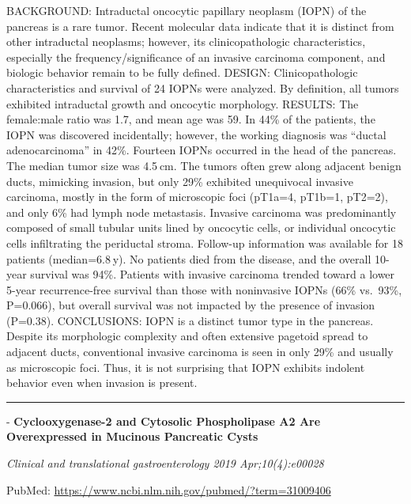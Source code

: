 \documentclass[]{article}
\begin{document}
BACKGROUND: Intraductal oncocytic papillary neoplasm (IOPN) of the
pancreas is a rare tumor. Recent molecular data indicate that it is
distinct from other intraductal neoplasms; however, its
clinicopathologic characteristics, especially the frequency/significance
of an invasive carcinoma component, and biologic behavior remain to be
fully defined. DESIGN: Clinicopathologic characteristics and survival of
24 IOPNs were analyzed. By definition, all tumors exhibited intraductal
growth and oncocytic morphology. RESULTS: The female:male ratio was 1.7,
and mean age was 59. In 44\% of the patients, the IOPN was discovered
incidentally; however, the working diagnosis was ``ductal
adenocarcinoma'' in 42\%. Fourteen IOPNs occurred in the head of the
pancreas. The median tumor size was 4.5 cm. The tumors often grew along
adjacent benign ducts, mimicking invasion, but only 29\% exhibited
unequivocal invasive carcinoma, mostly in the form of microscopic foci
(pT1a=4, pT1b=1, pT2=2), and only 6\% had lymph node metastasis.
Invasive carcinoma was predominantly composed of small tubular units
lined by oncocytic cells, or individual oncocytic cells infiltrating the
periductal stroma. Follow-up information was available for 18 patients
(median=6.8 y). No patients died from the disease, and the overall
10-year survival was 94\%. Patients with invasive carcinoma trended
toward a lower 5-year recurrence-free survival than those with
noninvasive IOPNs (66\% vs.~93\%, P=0.066), but overall survival was not
impacted by the presence of invasion (P=0.38). CONCLUSIONS: IOPN is a
distinct tumor type in the pancreas. Despite its morphologic complexity
and often extensive pagetoid spread to adjacent ducts, conventional
invasive carcinoma is seen in only 29\% and usually as microscopic foci.
Thus, it is not surprising that IOPN exhibits indolent behavior even
when invasion is present.

{}

{}

\begin{center}\rule{0.5\linewidth}{\linethickness}\end{center}

 - \textbf{Cyclooxygenase-2 and Cytosolic Phospholipase A2 Are
Overexpressed in Mucinous Pancreatic Cysts}

\emph{Clinical and translational gastroenterology 2019 Apr;10(4):e00028}

PubMed: \url{https://www.ncbi.nlm.nih.gov/pubmed/?term=31009406}
\end{document}

